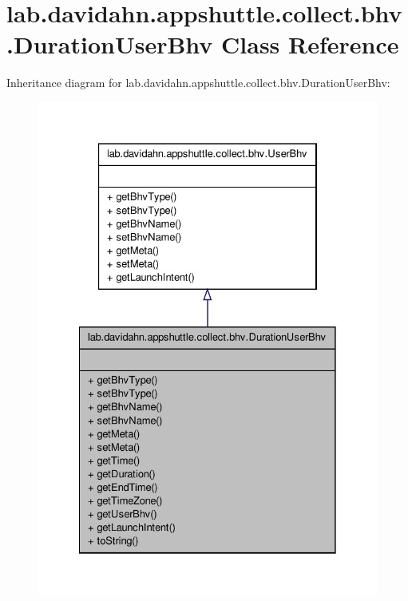 \hypertarget{classlab_1_1davidahn_1_1appshuttle_1_1collect_1_1bhv_1_1_duration_user_bhv}{\section{lab.\-davidahn.\-appshuttle.\-collect.\-bhv.\-Duration\-User\-Bhv \-Class \-Reference}
\label{classlab_1_1davidahn_1_1appshuttle_1_1collect_1_1bhv_1_1_duration_user_bhv}
}


\-Inheritance diagram for lab.\-davidahn.\-appshuttle.\-collect.\-bhv.\-Duration\-User\-Bhv\-:
\nopagebreak
\begin{figure}[H]
\begin{center}
\leavevmode
\includegraphics[width=328pt]{classlab_1_1davidahn_1_1appshuttle_1_1collect_1_1bhv_1_1_duration_user_bhv__inherit__graph}
\end{center}
\end{figure}


